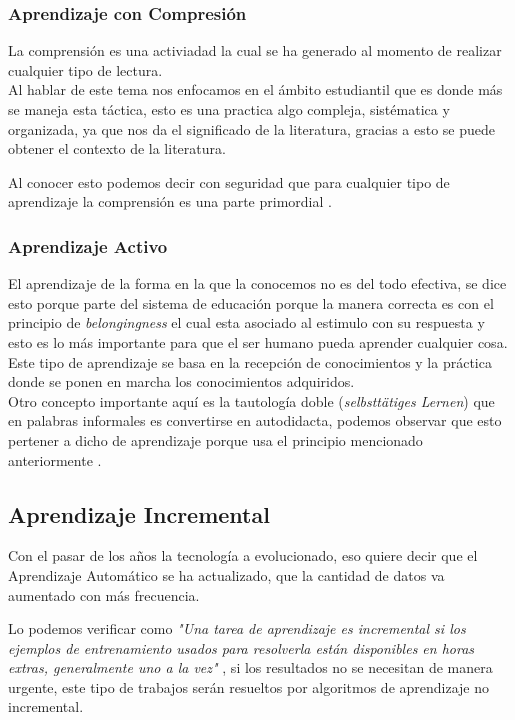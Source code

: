         \subsubsection{Aprendizaje con Compresi\'on}
            La comprensi\'on es una activiadad la cual se ha generado al momento de realizar cualquier tipo de lectura.\\
            Al hablar de este tema nos enfocamos en el \'ambito estudiantil que es donde m\'as se maneja esta t\'actica, esto es una
            practica algo compleja, sist\'ematica y organizada, ya que nos da el significado de la literatura, gracias a esto se puede
            obtener el contexto de la literatura.

            Al conocer esto podemos decir con seguridad que para cualquier tipo de aprendizaje la comprensi\'on es 
            una parte primordial \cite{perez2014}.

        \subsubsection{Aprendizaje Activo}
            El aprendizaje de la forma en la que la conocemos no es del todo efectiva, se dice esto porque parte del sistema de educaci\'on porque la manera 
            correcta es con el principio de \textit{belongingness} el cual esta asociado al estimulo con su respuesta
            y esto es lo m\'as importante para que el ser humano pueda aprender cualquier cosa.\\
            Este tipo de aprendizaje se basa en la recepci\'on de conocimientos y la pr\'actica donde se ponen en marcha los conocimientos adquiridos.\\
            Otro concepto importante aqu\'i es la tautolog\'ia doble (\textit{selbstt\"atiges Lernen}) que en palabras informales es convertirse en autodidacta, 
            podemos observar que esto pertener a dicho de aprendizaje porque usa el principio mencionado anteriormente \cite{Huber2008}.



    \subsection{Aprendizaje Incremental}
        Con el pasar de los años la tecnología a evolucionado, eso quiere decir que el Aprendizaje Automático se ha actualizado, que la 
        cantidad de datos va aumentado con más frecuencia.
        
        Lo podemos verificar como \textit{"Una tarea de aprendizaje es incremental si los ejemplos de entrenamiento usados para 
        resolverla están disponibles en horas extras, generalmente uno a la vez"} \cite{GiraudCarrier2000}, si los resultados no se 
        necesitan de manera urgente, este tipo de trabajos serán resueltos por algoritmos de aprendizaje no incremental. 


